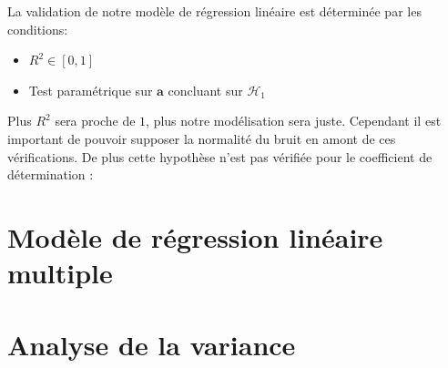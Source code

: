 \documentclass[12pt]{article}
\newcommand{\rect}[1]{\left[ #1 \right]}
\newcommand{\mc}[1]{\mathcal{#1}}
\begin{document}
La validation de notre modèle de régression linéaire est déterminée par les conditions:
\begin{itemize}[label*=\textbullet]
	\item $R^2 \in \rect{0,1}$
	\item Test paramétrique sur $\boldsymbol{a}$ concluant sur $\mc{H}_{1}$
\end{itemize}

Plus $R^2$ sera proche de $1$, plus notre modélisation sera juste. Cependant il est important de pouvoir supposer la normalité du bruit en amont de ces vérifications. De plus cette hypothèse n'est pas vérifiée pour le coefficient de détermination :



\section{Modèle de régression linéaire multiple}

\section{Analyse de la variance}
\end{document}
